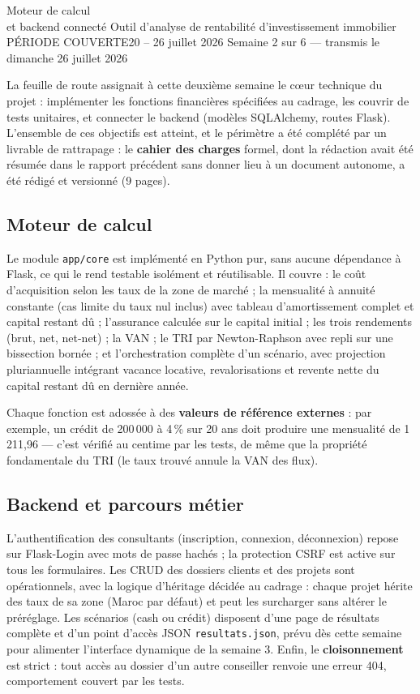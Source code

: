 \documentclass[11pt,a4paper]{article}
\begin{document}
	{Moteur de calcul \\ et backend connecté}
	{Outil d'analyse de rentabilité d'investissement immobilier}
	{PÉRIODE COUVERTE}{20 -- 26 juillet 2026}
	{Semaine 2 sur 6 — transmis le dimanche 26 juillet 2026}


La feuille de route assignait à cette deuxième semaine le cœur technique du projet : implémenter les fonctions financières spécifiées au cadrage, les couvrir de tests unitaires, et connecter le backend (modèles SQLAlchemy, routes Flask). L'ensemble de ces objectifs est atteint, et le périmètre a été complété par un livrable de rattrapage : le \textbf{cahier des charges} formel, dont la rédaction avait été résumée dans le rapport précédent sans donner lieu à un document autonome, a été rédigé et versionné (9 pages).

\subsection{Moteur de calcul}
Le module \texttt{app/core} est implémenté en Python pur, sans aucune dépendance à Flask, ce qui le rend testable isolément et réutilisable. Il couvre : le coût d'acquisition selon les taux de la zone de marché ; la mensualité à annuité constante (cas limite du taux nul inclus) avec tableau d'amortissement complet et capital restant dû ; l'assurance calculée sur le capital initial ; les trois rendements (brut, net, net-net) ; la VAN ; le TRI par Newton-Raphson avec repli sur une bissection bornée ; et l'orchestration complète d'un scénario, avec projection pluriannuelle intégrant vacance locative, revalorisations et revente nette du capital restant dû en dernière année.

Chaque fonction est adossée à des \textbf{valeurs de référence externes} : par exemple, un crédit de 200\,000 à 4\,\% sur 20 ans doit produire une mensualité de 1\,211,96 — c'est vérifié au centime par les tests, de même que la propriété fondamentale du TRI (le taux trouvé annule la VAN des flux).

\subsection{Backend et parcours métier}
L'authentification des consultants (inscription, connexion, déconnexion) repose sur Flask-Login avec mots de passe hachés ; la protection CSRF est active sur tous les formulaires. Les CRUD des dossiers clients et des projets sont opérationnels, avec la logique d'héritage décidée au cadrage : chaque projet hérite des taux de sa zone (Maroc par défaut) et peut les surcharger sans altérer le préréglage. Les scénarios (cash ou crédit) disposent d'une page de résultats complète et d'un point d'accès JSON \texttt{resultats.json}, prévu dès cette semaine pour alimenter l'interface dynamique de la semaine 3. Enfin, le \textbf{cloisonnement} est strict : tout accès au dossier d'un autre conseiller renvoie une erreur 404, comportement couvert par les tests.
\end{document}
